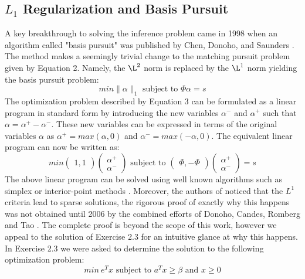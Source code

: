 \documentclass[12pt,a4paper]{article}
\begin{document}
\subsection{$L_1$ Regularization and Basis Pursuit}
A key breakthrough to solving the inference problem came in 1998 when an algorithm called "basis pursuit" was published by Chen, Donoho, and Saunders \cite{BasisPursuit}. The method makes a seemingly trivial change to the matching pursuit problem given by Equation 2. Namely, the $\L^2$ norm is replaced by the $\L^1$ norm yielding the basis pursuit problem: 
\begin{equation}
min \| \alpha \| _1 \mbox{ subject to } \Phi \alpha = s
\end{equation} 
The optimization problem described by Equation 3 can be formulated as a linear program in standard form by introducing the new variables $\alpha^-$ and $\alpha^+$ such that $\alpha = \alpha^+ - \alpha^-$. These new variables can be expressed in terms of the original variables $\alpha$ as $\alpha^+=max(\alpha,0)$ and $\alpha^-=max(-\alpha,0)$. The equivalent linear program can now be written as: 
\begin{equation} 
\nonumber
min \begin{pmatrix}1,1 \end{pmatrix} \begin{pmatrix} \alpha^+ \\ \alpha^- \end{pmatrix} \mbox{ subject to } \begin{pmatrix} \Phi, -\Phi \end{pmatrix} \begin{pmatrix} \alpha^+ \\ \alpha^- \end{pmatrix} = s
\end{equation}  
The above linear program can be solved using well known algorithms such as simplex or interior-point methods \cite{Nocedal and Wright}. Moreover, the authors of \cite{BasisPursuit} noticed that the $L^1$ criteria lead to sparse solutions, the rigorous proof of exactly why this happens was not obtained until 2006 by 
the combined efforts of Donoho, Candes, Romberg and Tao \cite{Compressive Sensing}. The complete proof is beyond the scope of this work, however we appeal to the solution of Exercise 2.3 \cite{David Eigen} for an intuitive glance at why this happens. In Exercise 2.3 we were asked to determine the solution to the following optimization problem: 
\begin{equation} 
min~ e^T x \mbox{ subject to } a^Tx \geq \beta \mbox{ and } x \geq 0 
\end{equation}
\end{document}
